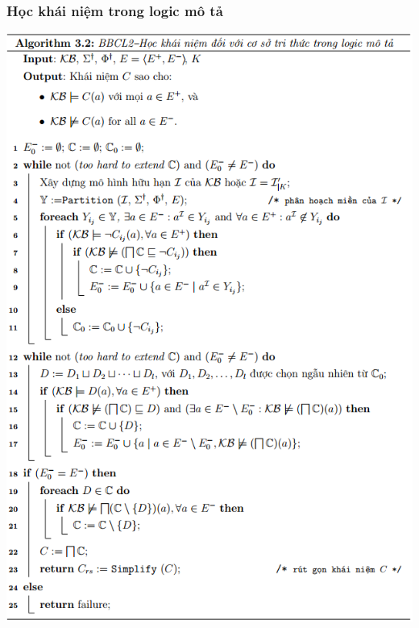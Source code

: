 \documentclass[fleqn]{beamer}
\begin{document}
\begin{frame}\frametitle{\bf Học khái niệm trong logic mô tả}
\includegraphics[scale=0.35]{ThuatToan2.png}
\end{frame}
\end{document}
